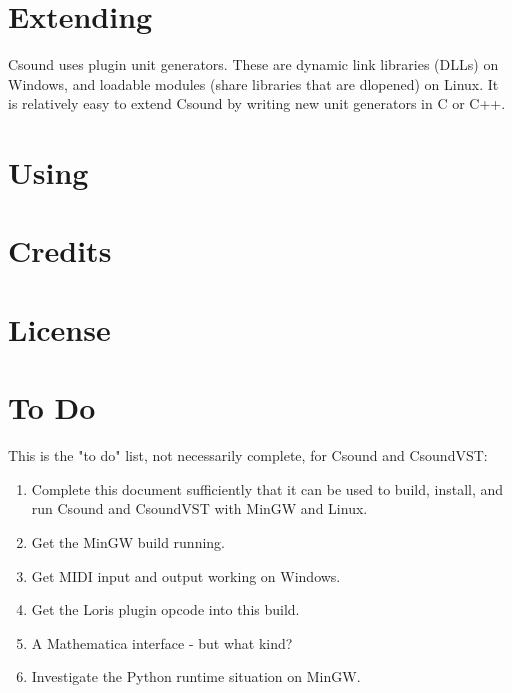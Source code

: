 \documentclass[10pt,letterpaper,onecolumn]{article}
\begin{document}
\section{Extending}
Csound uses plugin unit generators. These are dynamic link libraries (DLLs) on Windows, and loadable modules (share libraries that are dlopened) on Linux. It is relatively easy to extend Csound by writing new unit generators in C or C++.


\section{Using}
\section{Credits}
\section{License}
\section{To Do}
This is the "to do" list, not necessarily complete, for Csound and CsoundVST:
\begin{enumerate}
\item Complete this document sufficiently that it can be used to build, install, and run Csound and CsoundVST with MinGW and Linux.
\item Get the MinGW build running.
\item Get MIDI input and output working on Windows.
\item Get the Loris plugin opcode into this build.
\item A Mathematica interface - but what kind?
\item Investigate the Python runtime situation on MinGW.
\end{enumerate}
\end{document}
